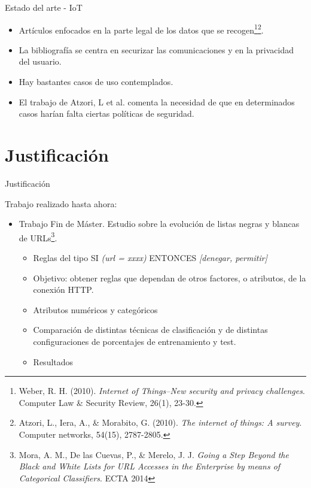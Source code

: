 \documentclass{beamer}
\begin{document}
\begin{frame}{Estado del arte - IoT}

\begin{itemize}
  \item<1-> Artículos enfocados en la parte legal de los datos que se recogen\footnote{Weber, R. H. (2010). \textit{Internet of Things–New security and privacy challenges}. Computer Law \& Security Review, 26(1), 23-30.}\footnote{Atzori, L., Iera, A., \& Morabito, G. (2010). \textit{The internet of things: A survey}. Computer networks, 54(15), 2787-2805.}.
  \item<2-> La bibliografía se centra en securizar las comunicaciones y en la privacidad del usuario.
  \item<3-> Hay bastantes casos de uso contemplados.
  \item<4-> El trabajo de Atzori, L et al. comenta la necesidad de que en determinados casos harían falta ciertas políticas de seguridad.
\end{itemize}

\end{frame}

\section{Justificación}

\begin{frame}{Justificación}

Trabajo realizado hasta ahora:

\begin{itemize}
  \item<1-> Trabajo Fin de Máster. Estudio sobre la evolución de listas negras y blancas de URLs\footnote{Mora, A. M., De las Cuevas, P., \& Merelo, J. J. \textit{Going a Step Beyond the Black and White Lists for URL Accesses in the Enterprise by means of Categorical Classifiers}. ECTA 2014}.
  \begin{itemize}
    \item<2-> Reglas del tipo SI \textit{(url = xxxx)} ENTONCES \textit{[denegar, permitir]}
    \item<3-> Objetivo: obtener reglas que dependan de otros factores, o atributos, de la conexión HTTP.
    \item<4-> Atributos numéricos y categóricos
    \item<5-> Comparación de distintas técnicas de clasificación y de distintas configuraciones de porcentajes de entrenamiento y test.
    \item<6-> Resultados
  \end{itemize}
\end{itemize}

\end{frame}
\end{document}
